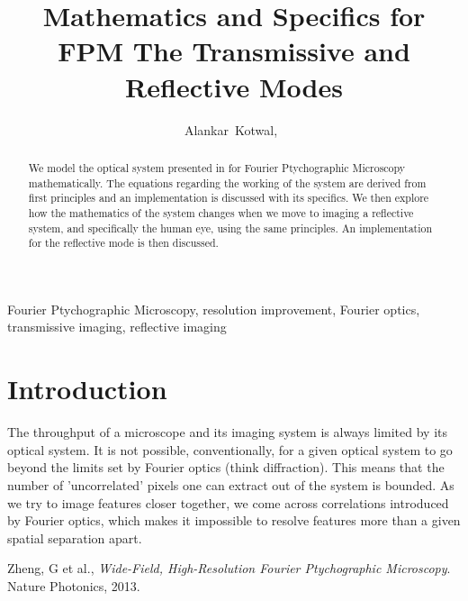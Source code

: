 \documentclass[11pt,a4paper,journal]{IEEEtran}
\title{Mathematics and Specifics for FPM \linebreak The Transmissive and Reflective Modes}
\author{Alankar~Kotwal,~\IEEEmembership{Indian Institute of Technology Bombay}}
\begin{document}
\maketitle

\begin{abstract}
We model the optical system presented in \cite{zheng13} for Fourier Ptychographic Microscopy mathematically. The equations regarding the working of the system are derived from first principles and an implementation is discussed with its specifics. We then explore how the mathematics of the system changes when we move to imaging a reflective system, and specifically the human eye, using the same principles. An implementation for the reflective mode is then discussed.
\end{abstract}

\begin{keywords}
Fourier Ptychographic Microscopy, resolution improvement, Fourier optics, transmissive imaging, reflective imaging
\end{keywords}

\section{Introduction}
The throughput of a microscope and its imaging system is always limited by its optical system. It is not possible, conventionally, for a given optical system to go beyond the limits set by Fourier optics (think diffraction). This means that the number of 'uncorrelated' pixels one can extract out of the system is bounded. As we try to image features closer together, we come across correlations introduced by Fourier optics, which makes it impossible to resolve features more than a given spatial separation apart.

\begin{thebibliography}{10}

  Zheng, G et al.,
  \emph{Wide-Field, High-Resolution Fourier Ptychographic Microscopy}.
  Nature Photonics,
  2013.
  
\end{thebibliography}
\end{document}
